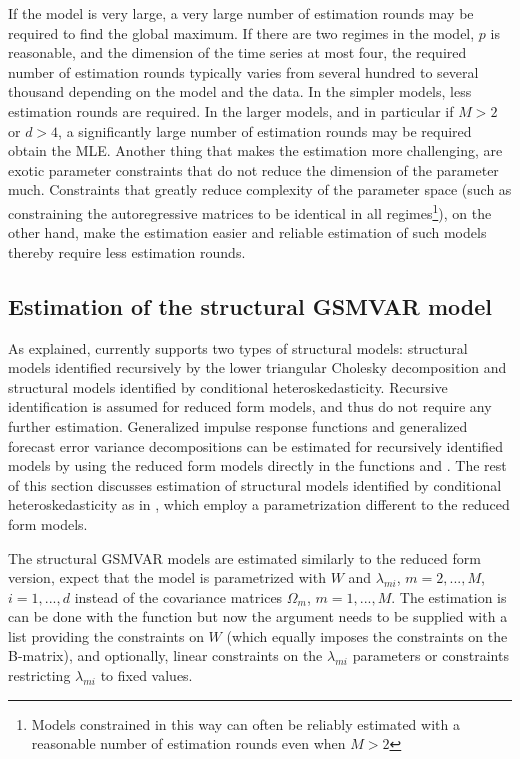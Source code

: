 \documentclass[nojss]{jss}
\begin{document}
If the model is very large, a very large number of estimation rounds may be required to find the global maximum. If there are two regimes in the model, $p$ is reasonable, and the dimension of the time series at most four, the required number of estimation rounds typically varies from several hundred to several thousand depending on the model and the data. In the simpler models, less estimation rounds are required. In the larger models, and in particular if $M>2$ or $d>4$, a significantly large number of estimation rounds may be required obtain the MLE. Another thing that makes the estimation more challenging, are exotic parameter constraints that do not reduce the dimension of the parameter much. Constraints that greatly reduce complexity of the parameter space (such as constraining the autoregressive matrices to be identical in all regimes\footnote{Models constrained in this way can often be reliably estimated with a reasonable number of estimation rounds even when $M>2$}), on the other hand, make the estimation easier and reliable estimation of such models thereby require less estimation rounds.


\subsection{Estimation of the structural GSMVAR model}\label{sec:estim_structural}
As explained,  currently supports two types of structural models: structural models identified recursively by the lower triangular Cholesky decomposition and structural models identified by conditional heteroskedasticity. Recursive identification is assumed for reduced form models, and thus do not require any further estimation.  Generalized impulse response functions and generalized forecast error variance decompositions can be estimated for recursively identified models by using the reduced form models directly in the functions  and . The rest of this section discusses estimation of structural models identified by conditional heteroskedasticity as in \cite{Virolainen2:2021}, which employ a parametrization different to the reduced form models.

The structural GSMVAR models are estimated similarly to the reduced form version, expect that the model is parametrized with $W$ and $\lambda_{mi}$, $m=2,...,M$, $i=1,...,d$ instead of the covariance matrices $\Omega_{m}$, $m=1,...,M$. The estimation is can be done with the function  but now the argument  needs to be supplied with a list providing the constraints on $W$ (which equally imposes the constraints on the B-matrix), and optionally, linear constraints on the $\lambda_{mi}$ parameters or constraints restricting $\lambda_{mi}$ to fixed values.
\end{document}
